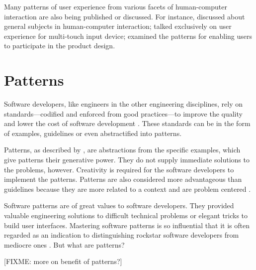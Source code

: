 \documentclass{acm_proc_article-sp}
\begin{document}
Many patterns of user experience from various facets of human-computer
interaction are also being published or discussed.  For instance,
\citet{patterns:tidwell} discussed about general subjects in
human-computer interaction; \citet{touch:boudreaux} talked exclusively
on user experience for multi-touch input device;
\citet{participatory:dearden} examined the patterns for enabling users
to participate in the product design.

\citet{unix:raymond}


\section{Patterns}
\label{sec:pattern}
Software developers, like engineers in the other engineering
disciplines, rely on standards---codified and enforced from good
practices---to improve the quality and lower the cost of software
development \citep{practice:ipenz}. These standards can be in the form
of examples, guidelines or even abstractified into patterns.

Patterns, as described by \citet{patterns:griffiths}, are abstractions
from the specific examples, which give patterns their generative
power. They do not supply immediate solutions to the problems,
however. Creativity is required for the software developers to
implement the patterns. Patterns are also considered more advantageous
than guidelines because they are more related to a context and are
problem centered \citep{patterns:welie}.

Software patterns are of great values to software developers. They
provided valuable engineering solutions to difficult technical
problems or elegant tricks to build user interfaces. Mastering
software patterns is so influential that it is often regarded as an
indication to distinguishing rockstar software developers from
mediocre ones \citep{rockstar:iskold}. But what are patterns?

[FIXME: more on benefit of patterns?]
\end{document}
